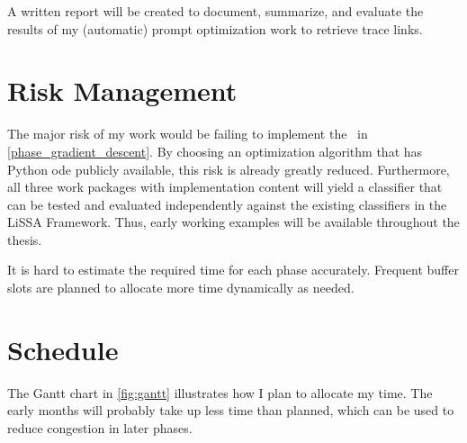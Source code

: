 A written report will be created to document, summarize, and evaluate the results of my (automatic) prompt optimization work to retrieve trace links.


\section{Risk Management}
\label{sec:work_risks}
The major risk of my work would be failing to implement the~ in \autoref{phase_gradient_descent}.
By choosing an optimization algorithm that has Python ode publicly available, this risk is already greatly reduced.
Furthermore, all three work packages with implementation content will yield a classifier that can be tested and evaluated independently against the existing classifiers in the LiSSA Framework.
Thus, early working examples will be available throughout the thesis.

It is hard to estimate the required time for each phase accurately.
Frequent buffer slots are planned to allocate more time dynamically as needed.




\section{Schedule}
\label{sec:work_gant}
The Gantt chart in \autoref{fig:gantt} illustrates how I plan to allocate my time.
The early months will probably take up less time than planned, which can be used to reduce congestion in later phases.


